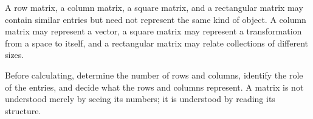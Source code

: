 \begin{interpretationbox}
A row matrix, a column matrix, a square matrix, and a rectangular matrix may
contain similar entries but need not represent the same kind of object. A column
matrix may represent a vector, a square matrix may represent a transformation
from a space to itself, and a rectangular matrix may relate collections of
different sizes.
\end{interpretationbox}

\begin{summarybox}
Before calculating, determine the number of rows and columns, identify the role
of the entries, and decide what the rows and columns represent. A matrix is not
understood merely by seeing its numbers; it is understood by reading its
structure.
\end{summarybox}
